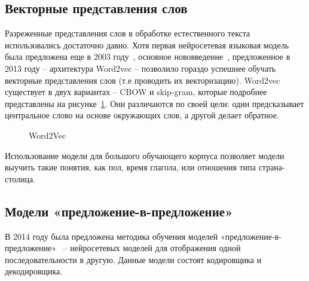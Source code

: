 \subsection{Векторные представления слов}
Разреженные представления слов в обработке естественного текста использовались достаточно давно. Хотя первая нейросетевая языковая модель была предложена еще в 2003 году~\cite{bengio_2003}, основное нововведение~\cite{mikolov_2013}, предложенное в 2013 году -- архитектура Word2vec -- позволило гораздо успешнее обучать векторные представления слов (т.е проводить их векторизацию). Word2vec существует в двух вариантах -- CBOW и skip-gram, которые подробнее представлены на рисунке~\ref{fig:Neuro2-Word2Vec}. Они различаются по своей цели: один предсказывает центральное слово на основе окружающих слов, а другой делает обратное.


\begin{figure}[ht]
 \caption{Word2Vec}\label{fig:Neuro2-Word2Vec}
\end{figure}

Использование модели для большого обучающего корпуса позволяет модели выучить такие понятия, как пол, время глагола, или отношения типа страна-столица. 

%
\subsection{Модели «предложение-в-предложение»}
В 2014 году была предложена методика обучения моделей «предложение-в-предложение»~\cite{sutskever_2014} -- нейросетевых моделей для отображения одной последовательности в другую. Данные модели состоят кодировщика и декодировщика. 

